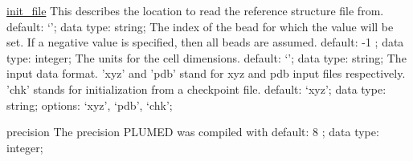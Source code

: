 \begin{ipifield}{}
\begin{ipifield}{\hyperref[INITFILE]{init\_file}}
{This describes the location to read the reference structure file from.}%
{default: `'; data type: string; }%
{%
{The index of the bead for which the value will be set. If a negative value is specified, then all beads are assumed.}%
{default:  -1 ; data type: integer; }%
%
{The units for the cell dimensions.}%
{default: `'; data type: string; }%
%
{The input data format. 'xyz' and 'pdb' stand for xyz and pdb input files respectively. 'chk' stands for initialization from a checkpoint file.}%
{default: `xyz'; data type: string; options: `xyz', `pdb', `chk'; }%
}
\end{ipifield}
\begin{ipifield}{precision}%
{The precision PLUMED was compiled with}%
{default:  8 ; data type: integer; }%
{}
\end{ipifield}
\end{ipifield}
